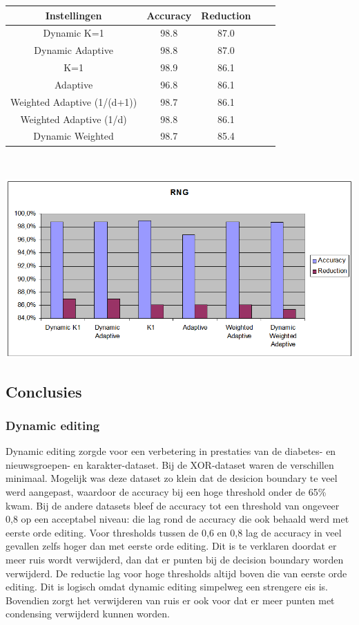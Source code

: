 \documentclass{article}
\begin{document}
\begin{tabular}{|c|c|c|c|c|}  \hline
Instellingen & Accuracy &	Reduction \\ \hline
Dynamic K=1	&	98.8 &  87.0 \\
Dynamic Adaptive &		98.8 &  87.0 \\
K=1 &				98.9 & 86.1 \\
Adaptive &			96.8  & 86.1 \\
Weighted Adaptive (1/(d+1)) &	98.7& 86.1 \\
Weighted Adaptive (1/d) &	98.8  & 86.1 \\
Dynamic Weighted &			98.7 & 85.4 \\ \hline
\end{tabular} \\

\begin{center} \includegraphics[scale=0.5]{dynamic_vs_1st_karakter} \end{center}

\subsection{Conclusies}
\subsubsection{Dynamic editing}
Dynamic editing zorgde voor een verbetering in prestaties van de diabetes- en nieuwsgroepen- en karakter-dataset. Bij de XOR-dataset waren de verschillen minimaal. Mogelijk was deze dataset zo klein dat de desicion boundary te veel werd aangepast, waardoor de accuracy bij een hoge threshold onder de 65\% kwam. Bij de andere datasets bleef de accuracy tot een threshold van ongeveer 0,8 op een acceptabel niveau: die lag rond de accuracy die ook behaald werd met eerste orde editing. Voor thresholds tussen de 0,6 en 0,8 lag de accuracy in veel gevallen zelfs hoger dan met eerste orde editing. Dit is te verklaren doordat er meer ruis wordt verwijderd, dan dat er punten bij de decision boundary worden verwijderd. De reductie lag voor hoge thresholds altijd boven die van eerste orde editing. Dit is logisch omdat dynamic editing simpelweg een strengere eis is. Bovendien zorgt het verwijderen van ruis er ook voor dat er meer punten met condensing verwijderd kunnen worden.
\end{document}
